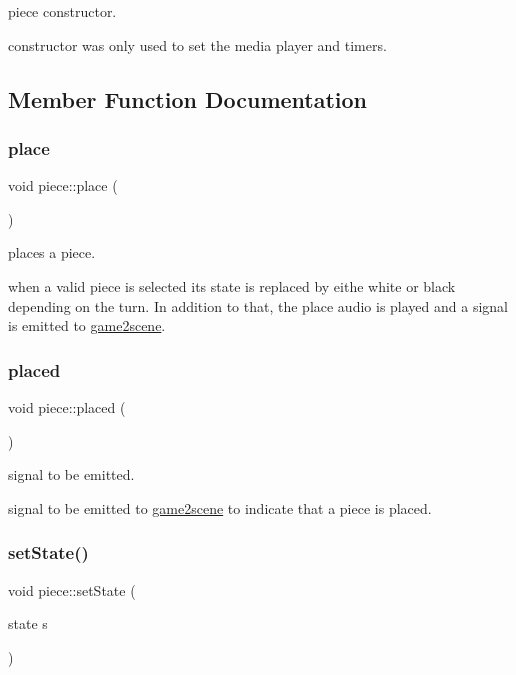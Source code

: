 piece constructor. 

constructor was only used to set the media player and timers. 

\subsection{Member Function Documentation}
\mbox{\label{classpiece_a8db42fa9c9e1b03f3a68f238546ab239}} 
\subsubsection{\texorpdfstring{place}{place}}
{\footnotesize\ttfamily void piece\+::place (\begin{DoxyParamCaption}{ }\end{DoxyParamCaption})\hspace{0.3cm}{\ttfamily [slot]}}



places a piece. 

when a valid piece is selected it\textquotesingle{}s state is replaced by eithe white or black depending on the turn. In addition to that, the place audio is played and a signal is emitted to \hyperlink{classgame2scene}{game2scene}. \mbox{\label{classpiece_a57ea505efe23d31353611198296a5a5a}} 
\subsubsection{\texorpdfstring{placed}{placed}}
{\footnotesize\ttfamily void piece\+::placed (\begin{DoxyParamCaption}{ }\end{DoxyParamCaption})\hspace{0.3cm}{\ttfamily [signal]}}



signal to be emitted. 

signal to be emitted to \hyperlink{classgame2scene}{game2scene} to indicate that a piece is placed. \mbox{\label{classpiece_a899f04d950ea038a6784cba40a1e4289}} 
\subsubsection{\texorpdfstring{set\+State()}{setState()}}
{\footnotesize\ttfamily void piece\+::set\+State (\begin{DoxyParamCaption}\item[{state}]{s }\end{DoxyParamCaption})}



